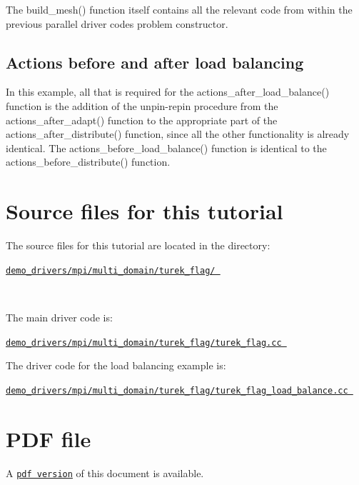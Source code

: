 The {\ttfamily build\+\_\+mesh()} function itself contains all the relevant code from within the previous parallel driver code\textquotesingle{}s problem constructor.\hypertarget{index_actions_functions}{}\subsection{Actions before and after load balancing}\label{index_actions_functions}
In this example, all that is required for the {\ttfamily actions\+\_\+after\+\_\+load\+\_\+balance()} function is the addition of the unpin-\/repin procedure from the {\ttfamily actions\+\_\+after\+\_\+adapt()} function to the appropriate part of the {\ttfamily actions\+\_\+after\+\_\+distribute()} function, since all the other functionality is already identical. The {\ttfamily actions\+\_\+before\+\_\+load\+\_\+balance()} function is identical to the {\ttfamily actions\+\_\+before\+\_\+distribute()} function.



 

\hypertarget{index_sources}{}\section{Source files for this tutorial}\label{index_sources}

\begin{DoxyItemize}
\item The source files for this tutorial are located in the directory\+:~\newline
~\newline
\begin{center} \href{../../../../demo_drivers/mpi/multi_domain/turek_flag/}{\tt demo\+\_\+drivers/mpi/multi\+\_\+domain/turek\+\_\+flag/ } \end{center} ~\newline

\item The main driver code is\+: ~\newline
~\newline
\begin{center} \href{../../../../demo_drivers/mpi/multi_domain/turek_flag/turek_flag.cc}{\tt demo\+\_\+drivers/mpi/multi\+\_\+domain/turek\+\_\+flag/turek\+\_\+flag.\+cc } \end{center} 
\item The driver code for the load balancing example is\+: ~\newline
~\newline
\begin{center} \href{../../../../demo_drivers/mpi/multi_domain/turek_flag/turek_flag_load_balance.cc}{\tt demo\+\_\+drivers/mpi/multi\+\_\+domain/turek\+\_\+flag/turek\+\_\+flag\+\_\+load\+\_\+balance.\+cc } \end{center} 
\end{DoxyItemize}



 

 \hypertarget{index_pdf}{}\section{P\+D\+F file}\label{index_pdf}
A \href{../latex/refman.pdf}{\tt pdf version} of this document is available. 
